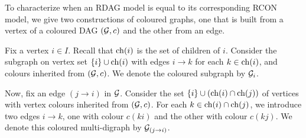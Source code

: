To characterize when an RDAG model is equal to its corresponding RCON model, we give two constructions of coloured graphs, one that is built from a vertex of a coloured DAG $(\mathcal{G},c)$ and the other from an edge.

Fix a vertex $i \in I$. Recall that $\operatorname{ch}(i)$ is the set of children of $i$.
Consider the subgraph on vertex set $\{ i \} \cup {\operatorname{ch}}(i)$ with edges $i \to k$ for each $k \in {\operatorname{ch}}(i)$, and colours inherited from $(\mathcal{G}, c)$. We denote the coloured subgraph by $\mathcal{G}_i$.

Now, fix an edge $(j \to i)$ in $\mathcal{G}$. Consider the set $\{ i \} \cup \left( {\rm ch}(i)\cap{\rm ch}(j) \right)$ of vertices with vertex colours inherited from $(\mathcal{G},c)$. For each $k \in {\rm ch}(i)\cap{\rm ch}(j)$, we introduce two edges $i \to k$, one with colour $c(ki)$ and the other with colour $c(kj)$. We denote this coloured multi-digraph by $\mathcal{G}_{(j \to i)}$.


